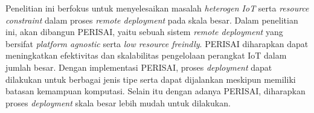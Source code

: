 Penelitian ini berfokus untuk menyelesaikan masalah \textit{heterogen IoT} serta \textit{resource constraint} dalam proses \textit{remote deployment} pada skala besar. Dalam penelitian ini, akan dibangun PERISAI, yaitu sebuah sistem \textit{remote deployment} yang bersifat \textit{platform agnostic} serta \textit{low resource freindly}. PERISAI diharapkan dapat meningkatkan efektivitas dan skalabilitas pengelolaan perangkat IoT dalam jumlah besar. Dengan implementasi PERISAI, proses \textit{deployment} dapat dilakukan untuk berbagai jenis tipe serta dapat dijalankan meskipun memiliki batasan kemampuan komputasi. Selain itu dengan adanya PERISAI, diharapkan proses \textit{deployment} skala besar lebih mudah untuk dilakukan.